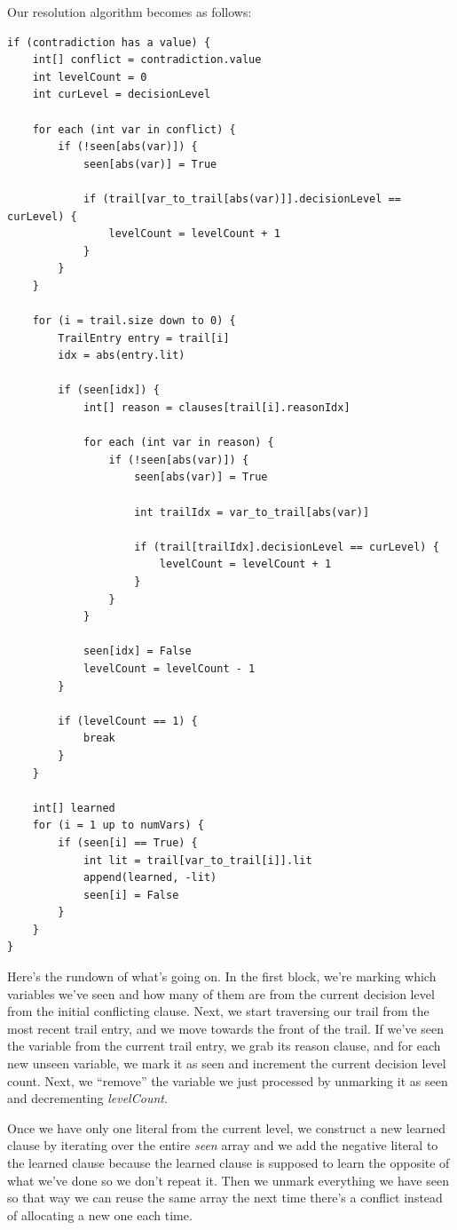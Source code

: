 \documentclass[../main.tex]{subfiles}
\begin{document}
Our resolution algorithm becomes as follows:
\begin{lstlisting}
if (contradiction has a value) {
    int[] conflict = contradiction.value
    int levelCount = 0
    int curLevel = decisionLevel

    for each (int var in conflict) {
        if (!seen[abs(var)]) {
            seen[abs(var)] = True 

            if (trail[var_to_trail[abs(var)]].decisionLevel == curLevel) {
                levelCount = levelCount + 1
            }
        }
    }

    for (i = trail.size down to 0) {
        TrailEntry entry = trail[i]
        idx = abs(entry.lit)

        if (seen[idx]) {
            int[] reason = clauses[trail[i].reasonIdx]

            for each (int var in reason) {
                if (!seen[abs(var)]) {
                    seen[abs(var)] = True 

                    int trailIdx = var_to_trail[abs(var)]

                    if (trail[trailIdx].decisionLevel == curLevel) {
                        levelCount = levelCount + 1
                    }
                }
            }

            seen[idx] = False
            levelCount = levelCount - 1
        }

        if (levelCount == 1) {
            break
        }
    }

    int[] learned
    for (i = 1 up to numVars) {
        if (seen[i] == True) {
            int lit = trail[var_to_trail[i]].lit
            append(learned, -lit)
            seen[i] = False
        }
    }
}
\end{lstlisting}
\noindent
Here's the rundown of what's going on. In the first block, we're marking which 
variables we've seen and how many of them are from the current decision level from 
the initial conflicting clause. Next, we start traversing our trail from the most recent 
trail entry, and we move towards the front of the trail. If we've seen the variable from 
the current trail entry, we grab its reason clause, and for each new unseen variable, 
we mark it as seen and increment the current decision level count. Next, we ``remove''
the variable we just processed by unmarking it as seen and decrementing \textit{levelCount}.

Once we have only one literal from the current level, we construct a new learned clause 
by iterating over the entire \textit{seen} array and we add the negative literal to the 
learned clause because the learned clause is supposed to learn the opposite of what we've 
done so we don't repeat it. Then we unmark everything we have seen so that way we can reuse 
the same array the next time there's a conflict instead of allocating a new one each time. 
\end{document}
